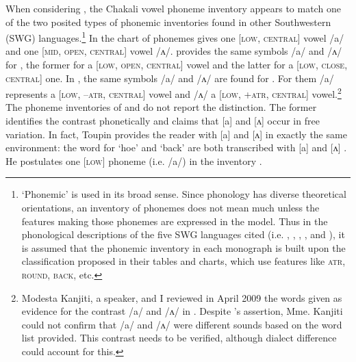 When considering  \cite{Rowl65, Crou66, Gray69,   Toup95, Crou03}, the Chakali vowel phoneme 
inventory appears to match one of the two posited types of  phonemic inventories found in other  
Southwestern  (SWG) languages.\footnote{`Phonemic' is used in its broad sense. Since phonology 
has diverse theoretical orientations,  an inventory of phonemes does not mean much unless the 
features making those phonemes are expressed in the model.  Thus in the phonological descriptions 
of the five SWG languages cited (i.e. , , ,  , and  ), it is assumed 
that the phonemic inventory in each monograph is built upon the classification proposed in their 
tables and charts, which use features like \textsc{atr}, \textsc{round}, \textsc{back}, etc.} In 
\citet[15]{Rowl65} the chart of  phonemes gives one [\textsc{low}, \textsc{central}] vowel 
/a/ and one [\textsc{mid}, \textsc{open}, \textsc{central}] vowel /ʌ/. \citet[17]{Crou66} provides 
the same symbols /a/ and /ʌ/ for , the former for a [\textsc{low}, \textsc{open}, 
\textsc{central}] vowel and the latter for a [\textsc{low}, \textsc{close}, \textsc{central}] one. 
In \citet[3]{Crou03}, the same symbols /a/ and /ʌ/ are found for . For them /a/ represents a 
[\textsc{low}, \textsc{--atr}, \textsc{central}] vowel and /ʌ/ a [\textsc{low}, \textsc{+atr}, 
\textsc{central}] vowel.\footnote{\label{fn:info-deg}Modesta Kanjiti, a   speaker,  and I 
reviewed  in April 2009 the words given as evidence for the contrast /a/ and /ʌ/ in 
\citet[20--21]{Crou03}. Despite  \citeauthor{Crou03}'s assertion,   Mme. Kanjiti could not confirm that /a/ 
and /ʌ/ were different sounds based on the word list provided. This contrast needs to be verified, 
although dialect difference could account for this.}   The phoneme inventories of \citet[16]{Toup95} 
and  \citet[21]{Gray69} do not report the distinction. The former identifies the contrast 
phonetically and claims that [a] and [ʌ] occur in free  variation. In fact, Toupin provides the 
reader with [a] and [ʌ] in exactly the same environment: the word for `hoe' and `back' are both 
transcribed with [a] and [ʌ]  \citep[26]{Toup95}. He postulates one [\textsc{low}] phoneme (i.e.  
/a/) in the inventory \citep[16]{Toup95}.

